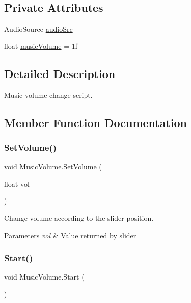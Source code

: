 \subsection*{Private Attributes}
\begin{DoxyCompactItemize}
\item 
Audio\+Source \mbox{\hyperlink{class_music_volume_afdba679e336ee79f311e1f16f525bd3c}{audio\+Src}}
\item 
float \mbox{\hyperlink{class_music_volume_a01774a02d195ef985412f3120d63f1e6}{music\+Volume}} = 1f
\end{DoxyCompactItemize}


\subsection{Detailed Description}
Music volume change script. 

\subsection{Member Function Documentation}
\mbox{\label{class_music_volume_a213432416fe8ef6f1e0ed8b6001cd363}} 
\subsubsection{\texorpdfstring{SetVolume()}{SetVolume()}}
{\footnotesize\ttfamily void Music\+Volume.\+Set\+Volume (\begin{DoxyParamCaption}\item[{float}]{vol }\end{DoxyParamCaption})}



Change volume according to the slider position. 


\begin{DoxyParams}{Parameters}
{\em vol} & Value returned by slider \\
\hline
\end{DoxyParams}
\mbox{\label{class_music_volume_a6ec38975ea3dcaf028dc63c79fbd6b72}} 
\subsubsection{\texorpdfstring{Start()}{Start()}}
{\footnotesize\ttfamily void Music\+Volume.\+Start (\begin{DoxyParamCaption}{ }\end{DoxyParamCaption})\hspace{0.3cm}{\ttfamily [private]}}



